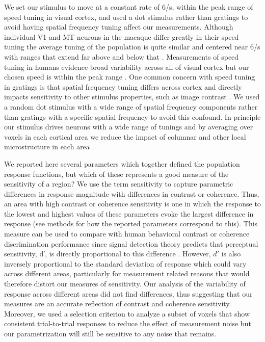 \documentclass{report}
\begin{document}
We set our stimulus to move at a constant rate of 6\degree/s, within the peak range of speed tuning in visual cortex, and used a dot stimulus rather than gratings to avoid having spatial frequency tuning affect our measurements. Although individual V1 and MT neurons in the macaque differ greatly in their speed tuning the average tuning of the population is quite similar and centered near 6\degree/s with ranges that extend far above and below that \citep{Priebe2006-uy}. Measurements of speed tuning in humans evidence broad variability across all of visual cortex but our chosen speed is within the peak range \citep{Singh2000-wr,Hammett2013-fg}. One common concern with speed tuning in gratings is that spatial frequency tuning differs across cortex and directly impacts sensitivity to other stimulus properties, such as image contrast \citep{Priebe2003-ua,Priebe2006-uy}. We used a random dot stimulus with a wide range of spatial frequency components rather than gratings with a specific spatial frequency to avoid this confound. In principle our stimulus drives neurons with a wide range of tunings and by averaging over voxels in each cortical area we reduce the impact of columnar and other local microstructure in each area \citep{Sun2007-cf,Liu2002-hy}.

We reported here several parameters which together defined the population response functions, but which of these represents a good measure of the sensitivity of a region? We use the term sensitivity to capture parametric differences in response magnitude with differences in contrast or coherence. Thus, an area with high contrast or coherence sensitivity is one in which the response to the lowest and highest values of these parameters evoke the largest difference in response (see methods for how the reported parameters correspond to this). This measure can be used to compare with human behavioral contrast or coherence discrimination performance since signal detection theory predicts that perceptual sensitivity, d′, is directly proportional to this difference \citep{Boynton1999-jd,Newsome1989-fr,Pestilli2011-gi,Tolhurst1983-cv,Zenger-Landolt2003-kq}. However, $d′$ is also inversely proportional to the standard deviation of response which could vary across different areas, particularly for measurement related reasons that would therefore distort our measures of sensitivity. Our analysis of the variability of response across different areas did not find differences, thus suggesting that our measures are an accurate reflection of contrast and coherence sensitivity. Moreover, we used a selection criterion to analyze a subset of voxels that show consistent trial-to-trial responses to reduce the effect of measurement noise but our parametrization will still be sensitive to any noise that remains.
\end{document}

